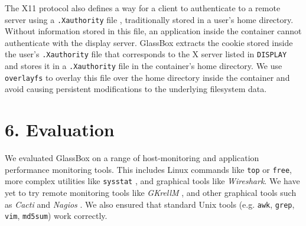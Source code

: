 \documentclass{proc}
\begin{document}
The X11 protocol also defines a way for a client to authenticate to a remote server using a \texttt{.Xauthority} file \cite{xsecurityman}, traditionally stored in a user's home directory. Without information stored in this file, an application inside the container cannot authenticate with the display server. GlassBox extracts the cookie stored inside the user's \texttt{.Xauthority} file that corresponds to the X server listed in \texttt{DISPLAY} and stores it in a \texttt{.Xauthority} file in the container's home directory. We use \texttt{overlayfs} to overlay this file over the home directory inside the container and avoid causing persistent modifications to the underlying filesystem data.

\section*{6. Evaluation}
We evaluated GlassBox on a range of host-monitoring and application performance monitoring tools. This includes Linux commands like \texttt{top} or \texttt{free}, more complex utilities like \texttt{sysstat} \cite{sysstat}, and graphical tools like \textit{Wireshark}. We have yet to try remote monitoring tools like \textit{GKrellM} \cite{gkrellm}, and other graphical tools such as \textit{Cacti} \cite{cacti} and \textit{Nagios} \cite{nagios}. We also ensured that standard Unix tools (e.g. \texttt{awk}, \texttt{grep}, \texttt{vim}, \texttt{md5sum}) work correctly.
\end{document}
